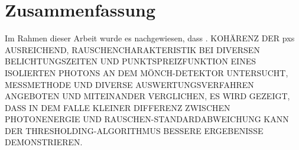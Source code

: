 \chapter{Zusammenfassung}
Im Rahmen dieser Arbeit wurde es nachgewiesen, dass . KOHÄRENZ DER \gls{pxs} AUSREICHEND, RAUSCHENCHARAKTERISTIK BEI DIVERSEN BELICHTUNGSZEITEN UND PUNKTSPREIZFUNKTION EINES ISOLIERTEN PHOTONS AN DEM MÖNCH-DETEKTOR UNTERSUCHT, MESSMETHODE UND DIVERSE AUSWERTUNGSVERFAHREN ANGEBOTEN UND MITEINANDER VERGLICHEN, ES WIRD GEZEIGT, DASS IN DEM FALLE KLEINER DIFFERENZ ZWISCHEN PHOTONENERGIE UND RAUSCHEN-STANDARDABWEICHUNG KANN DER THRESHOLDING-ALGORITHMUS BESSERE ERGEBENISSE DEMONSTRIEREN.